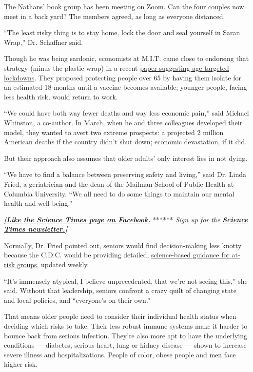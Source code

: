 The Nathans' book group has been meeting on Zoom. Can the four couples
now meet in a back yard? The members agreed, as long as everyone
distanced.

``The least risky thing is to stay home, lock the door and seal yourself
in Saran Wrap,'' Dr. Schaffner said.

Though he was being sardonic, economists at M.I.T. came close to
endorsing that strategy (minus the plastic wrap) in a recent
\href{https://www.nber.org/papers/w27102}{paper suggesting age-targeted
lockdowns}. They proposed protecting people over 65 by having them
isolate for an estimated 18 months until a vaccine becomes available;
younger people, facing less health risk, would return to work.

``We could have both way fewer deaths and way less economic pain,'' said
Michael Whinston, a co-author. In March, when he and three colleagues
developed their model, they wanted to avert two extreme prospects: a
projected 2 million American deaths if the country didn't shut down;
economic devastation, if it did.

But their approach also assumes that older adults' only interest lies in
not dying.

``We have to find a balance between preserving safety and living,'' said
Dr. Linda Fried, a geriatrician and the dean of the Mailman School of
Public Health at Columbia University. ``We all need to do some things to
maintain our mental health and well-being.''

\textbf{\emph{{[}}\href{http://on.fb.me/1paTQ1h}{\emph{Like the Science
Times page on Facebook.}}} ****** \emph{\textbar{} Sign up for the}
\textbf{\href{http://nyti.ms/1MbHaRU}{\emph{Science Times
newsletter.}}\emph{{]}}}

Normally, Dr. Fried pointed out, seniors would find decision-making less
knotty because the C.D.C. would be providing detailed,
\href{https://www.cdc.gov/coronavirus/2019-ncov/need-extra-precautions/older-adults.html}{science-based
guidance for at-risk groups}, updated weekly.

``It's immensely atypical, I believe unprecedented, that we're not
seeing this,'' she said. Without that leadership, seniors confront a
crazy quilt of changing state and local policies, and ``everyone's on
their own.''

That means older people need to consider their individual health status
when deciding which risks to take. Their less robust immune systems make
it harder to bounce back from serious infection. They're also more apt
to have the underlying conditions --- diabetes, serious heart, lung or
kidney disease --- shown to increase severe illness and
hospitalizations. People of color, obese people and men face higher
risk.

